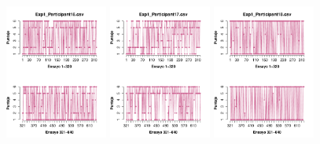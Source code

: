 \begin{figure}[th]
\includegraphics[width=0.30\textwidth]{Figures/Rating_Exp1_P16} \includegraphics[width=0.30\textwidth]{Figures/Rating_Exp1_P17} \includegraphics[width=0.30\textwidth]{Figures/Rating_Exp1_P18}

\end{figure}
